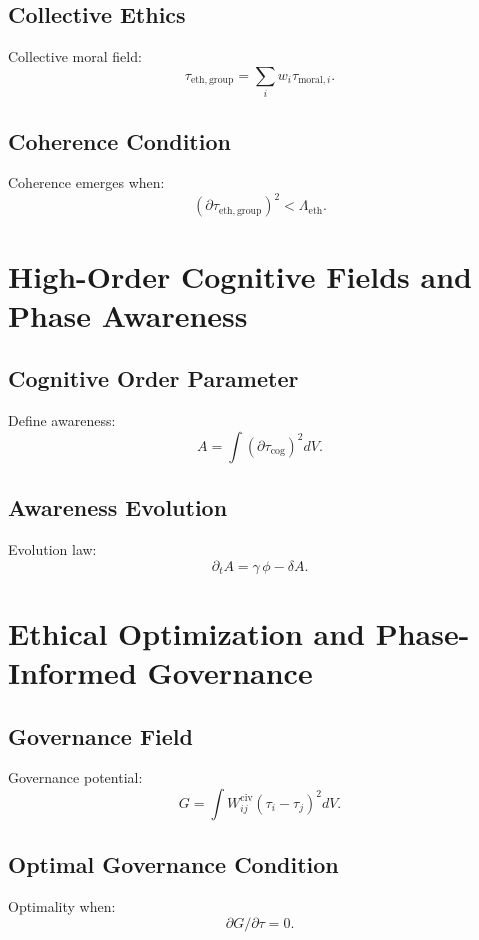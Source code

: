 \section{Collective Ethics}
Collective moral field:
\[
\tau_{\mathrm{eth,group}} = \sum_i w_i \tau_{\mathrm{moral},i}.
\]

\section{Coherence Condition}
Coherence emerges when:
\[
(\partial\tau_{\mathrm{eth,group}})^2 < \Lambda_{\mathrm{eth}}.
\]

\chapter{High-Order Cognitive Fields and Phase Awareness}

\section{Cognitive Order Parameter}
Define awareness:
\[
A = \int (\partial\tau_{\mathrm{cog}})^2 dV.
\]

\section{Awareness Evolution}
Evolution law:
\[
\partial_t A = \gamma\,\phi - \delta A.
\]

\chapter{Ethical Optimization and Phase-Informed Governance}

\section{Governance Field}
Governance potential:
\[
G = \int W^{\mathrm{civ}}_{ij}(\tau_i - \tau_j)^2 dV.
\]

\section{Optimal Governance Condition}
Optimality when:
\[
\partial G/\partial\tau = 0.
\]
